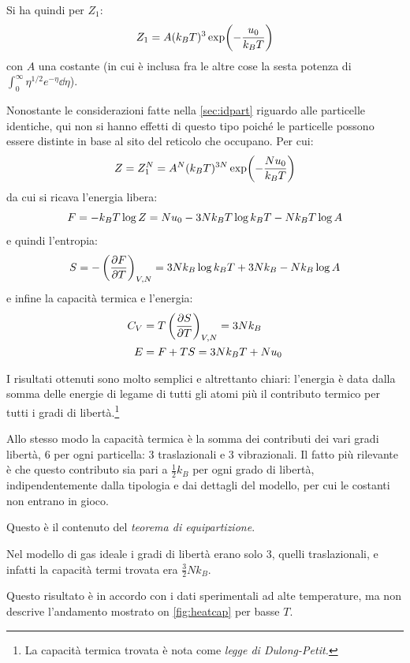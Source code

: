 Si ha quindi per $ Z_1 $:
\begin{equation*}
	Z_1 = A (k_B T)^3 \exp(-\frac{u_0}{k_B T})
\end{equation*}
con $ A $ una costante (in cui è inclusa fra le altre cose la sesta potenza di $ \int_{0}^{\infty} \eta^{1/2} e^{-\eta} \dd \eta $).

Nonostante le considerazioni fatte nella \cref{sec:idpart} riguardo alle particelle identiche, qui non si hanno effetti di questo tipo poiché le particelle possono essere distinte in base al sito del reticolo che occupano. Per cui:
\begin{equation*}
Z = Z_1^N = A^N (k_B T)^{3N} \exp(-\frac{N u_0}{k_B T})
\end{equation*}
da cui si ricava l'energia libera:
\begin{equation*}
F = - k_B T \log Z = N u_0 -3 N k_B T \log k_B T - Nk_B T \log A
\end{equation*}
e quindi l'entropia:
\begin{equation*}
S = - \left(\frac{\partial {F}}{\partial {T}}\right)_{V,N} = 3 N k_B \log k_B T + 3 N k_B - N k_B \log A
\end{equation*}
e infine la capacità termica e l'energia:
\begin{align*}
C_V &= T \left(\frac{\partial {S}}{\partial {T}}\right)_{V,N} = 3 N k_B\\
E &= F + TS = 3 N k_B T + N u_0
\end{align*}

I risultati ottenuti sono molto semplici e altrettanto chiari: l'energia è data dalla somma delle energie di legame di tutti gli atomi più il contributo termico per tutti i gradi di libertà.\footnote{La capacità termica trovata è nota come \textit{legge di Dulong-Petit.}}

Allo stesso modo la capacità termica è la somma dei contributi dei vari gradi libertà, $ 6 $ per ogni particella: $ 3 $ traslazionali e $ 3 $ vibrazionali. Il fatto più rilevante è che questo contributo sia pari a $ \frac{1}{2} k_B$ per ogni grado di libertà, indipendentemente dalla tipologia e dai dettagli del modello, per cui le costanti non entrano in gioco.

Questo è il contenuto del \textit{teorema di equipartizione}.

\begin{es}
	Nel modello di gas ideale i gradi di libertà erano solo 3, quelli traslazionali, e infatti la capacità termi trovata era $ \frac{3}{2} N k_B$.
\end{es}

Questo risultato è in accordo con i dati sperimentali ad alte temperature, ma non descrive l'andamento mostrato on \cref{fig:heatcap} per basse $ T $.

